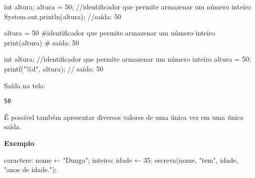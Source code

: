 \documentclass[
  letterpaper,
  DIV=11,
  numbers=noendperiod]{scrreprt}
\newenvironment{Shaded}{\begin{snugshade}}{\end{snugshade}}
\newcommand{\AttributeTok}[1]{\textcolor[rgb]{0.40,0.45,0.13}{#1}}
\newcommand{\BuiltInTok}[1]{\textcolor[rgb]{0.00,0.23,0.31}{#1}}
\newcommand{\CommentTok}[1]{\textcolor[rgb]{0.37,0.37,0.37}{#1}}
\newcommand{\DataTypeTok}[1]{\textcolor[rgb]{0.68,0.00,0.00}{#1}}
\newcommand{\DecValTok}[1]{\textcolor[rgb]{0.68,0.00,0.00}{#1}}
\newcommand{\FunctionTok}[1]{\textcolor[rgb]{0.28,0.35,0.67}{#1}}
\newcommand{\NormalTok}[1]{\textcolor[rgb]{0.00,0.23,0.31}{#1}}
\newcommand{\OperatorTok}[1]{\textcolor[rgb]{0.37,0.37,0.37}{#1}}
\newcommand{\SpecialCharTok}[1]{\textcolor[rgb]{0.37,0.37,0.37}{#1}}
\newcommand{\StringTok}[1]{\textcolor[rgb]{0.13,0.47,0.30}{#1}}
\begin{document}
\begin{Shaded}
\begin{Highlighting}[]
\NormalTok{int altura}\OperatorTok{;}
\NormalTok{altura }\OperatorTok{=} \DecValTok{50}\OperatorTok{;} \CommentTok{//identificador que permite armazenar um número inteiro}
\NormalTok{System}\OperatorTok{.}\AttributeTok{out}\OperatorTok{.}\FunctionTok{println}\NormalTok{(altura)}\OperatorTok{;} \CommentTok{//saída: 50}
\end{Highlighting}
\end{Shaded}

\begin{Shaded}
\begin{Highlighting}[]
\NormalTok{altura }\OperatorTok{=} \DecValTok{50} \CommentTok{\#identificador que permite armazenar um número inteiro}
\BuiltInTok{print}\NormalTok{(altura) }\CommentTok{\# saída: 50}
\end{Highlighting}
\end{Shaded}

\begin{Shaded}
\begin{Highlighting}[]
\DataTypeTok{int}\NormalTok{ altura}\OperatorTok{;} \CommentTok{//identificador que permite armazenar um número inteiro}
\NormalTok{altura }\OperatorTok{=} \DecValTok{50}\OperatorTok{;}
\NormalTok{printf}\OperatorTok{(}\StringTok{"}\SpecialCharTok{\%d}\StringTok{"}\OperatorTok{,}\NormalTok{ altura}\OperatorTok{);} \CommentTok{// saída: 50}
\end{Highlighting}
\end{Shaded}

Saída na tela:

\begin{verbatim}
50
\end{verbatim}

É possível também apresentar diversos valores de uma única vez em uma
única saída.

\textbf{Exemplo}

\begin{Shaded}
\begin{Highlighting}[]
\NormalTok{caractere}\OperatorTok{:}\NormalTok{ nome ← }\StringTok{"Dunga"}\OperatorTok{;}
\NormalTok{inteiro}\OperatorTok{:}\NormalTok{ idade ← }\DecValTok{35}\OperatorTok{;}
\NormalTok{escreva}\OperatorTok{(}\NormalTok{nome}\OperatorTok{,} \StringTok{"tem"}\OperatorTok{,}\NormalTok{ idade}\OperatorTok{,} \StringTok{"anos de idade."}\OperatorTok{);}
\end{Highlighting}
\end{Shaded}
\end{document}
